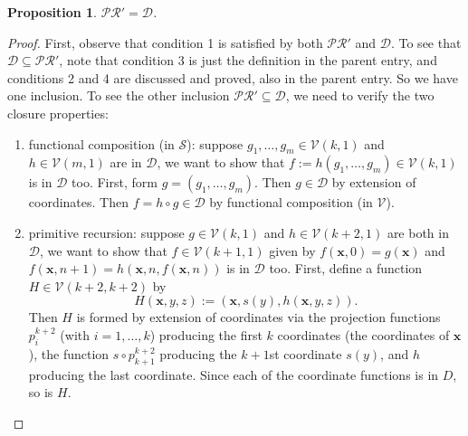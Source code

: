 \documentclass[12pt]{article}
\newtheorem{prop}{Proposition}
\begin{document}
\begin{prop} $\mathcal{PR}'=\mathcal{D}$. \end{prop}
\begin{proof}  First, observe that condition 1 is satisfied by both $\mathcal{PR}'$ and $\mathcal{D}$.  To see that $\mathcal{D}\subseteq \mathcal{PR}'$, note that condition 3 is just the definition in the parent entry, and conditions 2 and 4 are discussed and proved, also in the parent entry.  So we have one inclusion.  To see the other inclusion $\mathcal{PR}'\subseteq \mathcal{D}$, we need to verify the two closure properties:
\begin{enumerate}
\item functional composition (in $\mathcal{S}$): suppose $g_1,\ldots,g_m\in \mathcal{V}(k,1)$ and $h\in \mathcal{V}(m,1)$ are in $\mathcal{D}$, we want to show that $f:=h(g_1,\ldots, g_m) \in \mathcal{V}(k,1)$ is in $\mathcal{D}$ too.  First, form $g=(g_1,\ldots, g_m)$.  Then $g\in \mathcal{D}$ by extension of coordinates.  Then $f=h\circ g \in \mathcal{D}$ by functional composition (in $\mathcal{V}$).
\item primitive recursion: suppose $g\in \mathcal{V}(k,1)$ and $h\in \mathcal{V}(k+2,1)$ are both in $\mathcal{D}$, we want to show that $f\in \mathcal{V}(k+1,1)$ given by $f(\boldsymbol{x},0)=g(\boldsymbol{x})$ and $f(\boldsymbol{x},n+1) = h(\boldsymbol{x},n,f(\boldsymbol{x},n))$ is in $\mathcal{D}$ too.  First, define a function $H \in \mathcal{V}(k+2,k+2)$ by $$H(\boldsymbol{x},y,z):=(\boldsymbol{x},s(y),h(\boldsymbol{x},y,z)).$$
Then $H$ is formed by extension of coordinates via the projection functions $p_i^{k+2}$ (with $i=1,\ldots, k$) producing the first $k$ coordinates (the coordinates of $\boldsymbol{x}$), the function $s\circ p_{k+1}^{k+2}$ producing the $k+1$st coordinate $s(y)$, and $h$ producing the last coordinate.  Since each of the coordinate functions is in $D$, so is $H$.  


\end{enumerate}
\end{proof}
\end{document}
